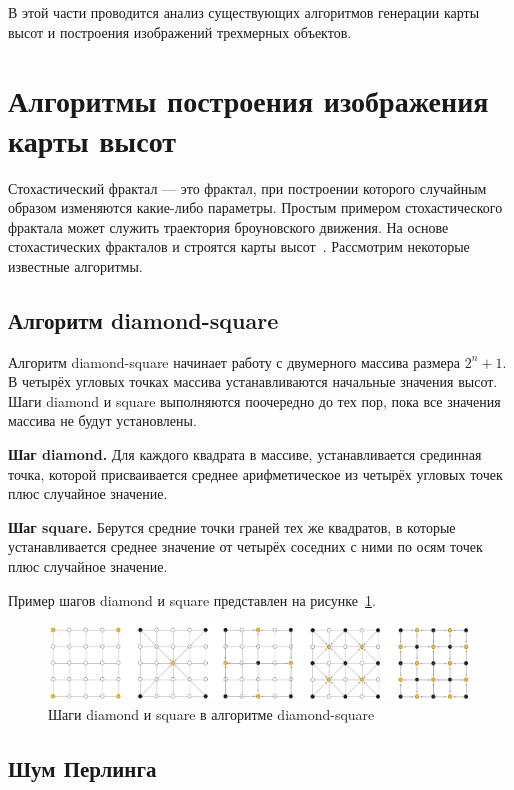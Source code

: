 \documentclass[a4paper, 14pt]{extreport}
\begin{document}
В этой части проводится анализ существующих алгоритмов генерации карты высот и построения изображений трехмерных 
объектов.

\section{Алгоритмы построения изображения карты высот}

Стохастический фрактал --- это фрактал, при построении которого случайным образом изменяются какие-либо параметры. 
Простым примером стохастического фрактала может служить траектория броуновского движения. На основе стохастических
фракталов и строятся карты высот~\cite{fractal}. Рассмотрим некоторые известные алгоритмы.

\subsection{Алгоритм diamond-square}

Алгоритм diamond-square начинает работу с двумерного массива размера $2^n + 1$. В четырёх угловых точках массива 
устанавливаются начальные значения высот. Шаги diamond и square выполняются поочередно до тех пор, пока все значения 
массива не будут установлены.~\cite{landscape}

\textbf{Шаг diamond.} Для каждого квадрата в массиве, устанавливается срединная точка, которой присваивается среднее
арифметическое из четырёх угловых точек плюс случайное значение.~\cite{landscape}

\textbf{Шаг square.} Берутся средние точки граней тех же квадратов, в которые устанавливается среднее значение от четырёх 
соседних с ними по осям точек плюс случайное значение.~\cite{landscape}

Пример шагов diamond и square представлен на рисунке~\ref{analytic:ds}.
\begin{figure}[h]
	\centering
	\includegraphics[scale=0.5]{tools/diamond-square.png}
	\caption{Шаги diamond и square в алгоритме diamond-square}
	\label{analytic:ds}
\end{figure}

\subsection{Шум Перлинга}
\end{document}
